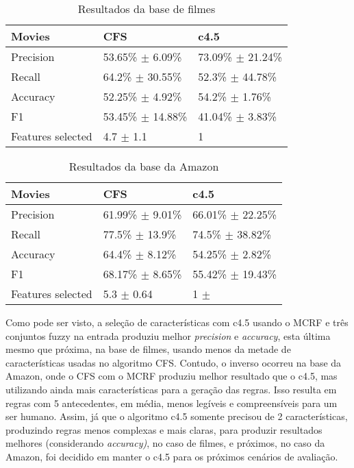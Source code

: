 \begin{table}[!h]
    \begin{tabular}{lll}
    Movies         				 & CFS                                 	 	 & c4.5                                  \\ \hline
    Precision                   & 53.65\% $\pm$ 6.09\% 			 & 73.09\% $\pm$ 21.24\% \\
    Recall                        & 64.2\% $\pm$ 30.55\% 		 & 52.3\% $\pm$ 44.78\% \\
    Accuracy                   & 52.25\% $\pm$ 4.92\% 			 & 54.2\% $\pm$ 1.76\% \\
    F1                  			 & 53.45\% $\pm$ 14.88\% 	     & 41.04\% $\pm$ 3.83\% \\
    Features selected      & 4.7 $\pm$ 1.1            			 & 1                                     \\
    \end{tabular}
    \caption{Resultados da base de filmes}
	\label{table:movies}
\end{table}

\begin{table}[!h]
    \begin{tabular}{lll}
    Movies         					& CFS                          		& c4.5                                  \\ \hline
    Precision                     & 61.99\% $\pm$ 9.01\% 	& 66.01\% $\pm$ 22.25\%  \\
    Recall                          & 77.5\% $\pm$ 13.9\% 		& 74.5\% $\pm$ 38.82\% \\
    Accuracy                     & 64.4\% $\pm$ 8.12\% 		& 54.25\% $\pm$ 2.82\% \\
    F1                                & 68.17\% $\pm$ 8.65\% 	& 55.42\% $\pm$ 19.43\% \\
    Features selected 		& 5.3 $\pm$ 0.64               & 1 $\pm$                                  \\
    \end{tabular}
    \caption{Resultados da base da Amazon}
	\label{table:amazon}
\end{table}

Como pode ser visto, a seleção de características com c4.5 usando o MCRF e três conjuntos fuzzy na entrada produziu melhor \textit{precision} e \textit{accuracy}, esta última mesmo que próxima, na base de filmes, usando menos da metade de características usadas no algoritmo CFS. Contudo, o inverso ocorreu na base da Amazon, onde o CFS com o MCRF produziu melhor resultado que o c4.5, mas utilizando ainda mais características para a geração das regras. Isso resulta em regras com 5 antecedentes, em média, menos legíveis e compreensíveis para um ser humano. Assim, já que o algoritmo c4.5 somente precisou de 2 características, produzindo regras menos complexas e mais claras, para produzir resultados melhores (considerando \textit{accuracy)}, no caso de filmes, e próximos, no caso da Amazon, foi decidido em manter o c4.5 para os próximos cenários de avaliação. 

